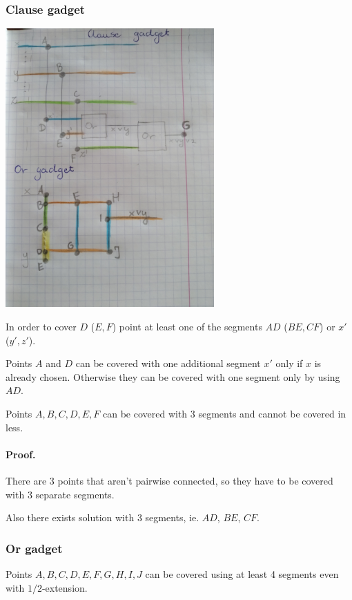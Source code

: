 \subsubsection{Clause gadget}
\includegraphics[width=0.6\textwidth]{clause_gadget.jpg}

\begin{lemma}
In order to cover $D$ ($E, F$) point at least one
of the segments $AD$ ($BE, CF$) or $x'$ ($y', z'$).
\end{lemma}

\begin{lemma}
Points $A$ and $D$ can be covered
with one additional segment $x'$
only if $x$ is already chosen.
Otherwise they can be covered with one segment
only by using $AD$.
\end{lemma}

\begin{lemma}
Points $A, B, C, D, E, F$ can be covered with 
3 segments and cannot be covered in less.
\end{lemma}

\paragraph{Proof.}
There are 3 points that aren't pairwise connected,
so they have to be covered with 3 separate segments.

Also there exists solution with 3 segments, ie. $AD$, $BE$, $CF$.

\subsubsection{Or gadget}
\begin{lemma}
Points $A, B, C, D, E, F, G, H, I, J$ can be covered using
at least 4 segments even with $1/2$-extension.
\end{lemma}

